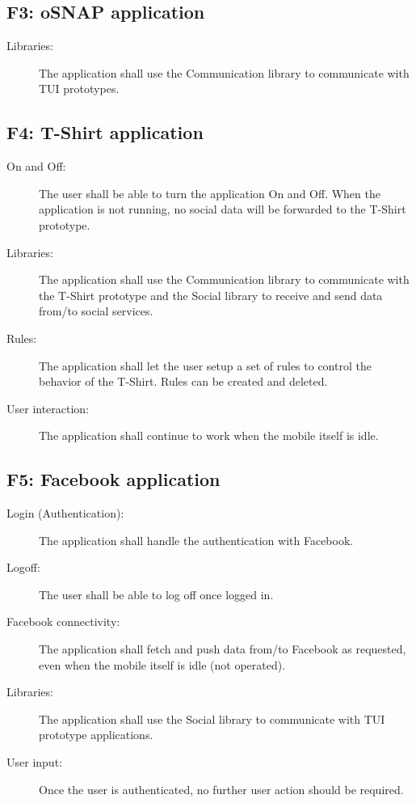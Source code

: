 \newpage

\subsection{F3: oSNAP application}
\begin{description}
	\item[Libraries:] The application shall use the Communication library
	to communicate with TUI prototypes.
\end{description}

\subsection{F4: T-Shirt application}
\begin{description}
	\item[On and Off:] The user shall be able to turn the application On
	and Off. When the application is not running, no social data will be
	forwarded to the T-Shirt prototype.
	\item[Libraries:] The application shall use the Communication library to
	communicate with the T-Shirt prototype and the Social library to
	receive and send data from/to social services.
	\item[Rules:] The application shall let the user setup a set of rules
	to control the behavior of the T-Shirt. Rules can be created and deleted.
	\item[User interaction:] The application shall continue to work
	when the mobile itself is idle.
\end{description}

\subsection{F5: Facebook application}
\begin{description}
	\item[Login (Authentication):] The application shall handle the
	authentication with Facebook.
	\item[Logoff:] The user shall be able to log off once logged in.
	\item[Facebook connectivity:] The application shall fetch and push data
	from/to Facebook as requested, even when the mobile itself is idle
	(not operated).
	\item[Libraries:] The application shall use the Social library to
	communicate with TUI prototype applications.
	\item[User input:] Once the user is authenticated, no further user action
	should be required.
\end{description}

